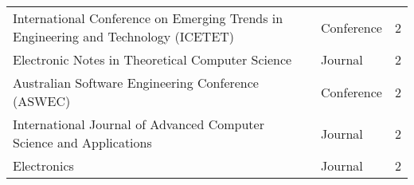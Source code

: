 \begin{table}[]
\begin{tabularx}{\textwidth}{Xlc}
International Conference on Emerging Trends in Engineering and Technology (ICETET) & Conference & \cellcolor{gray!30}2 \\
Electronic Notes in Theoretical Computer Science & Journal & \cellcolor{gray!30}2 \\
Australian Software Engineering Conference (ASWEC) & Conference & \cellcolor{gray!30}2 \\
International Journal of Advanced Computer Science and Applications & Journal & \cellcolor{gray!30}2 \\
Electronics & Journal & \cellcolor{gray!30}2 \\
\hline
\end{tabularx}
\end{table}